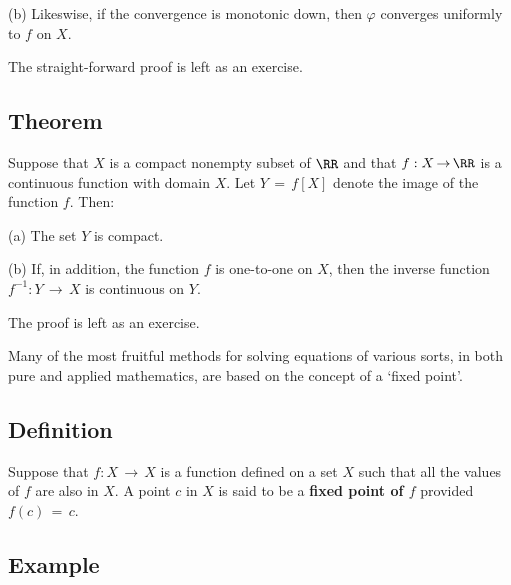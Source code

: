 \V

        (b) Likeswise, if the convergence is monotonic down, then ${\varphi}$ converges uniformly to $f$ on $X$.

\V

        The straight-forward proof is left as an exercise.

\V
\V


             \subsection{\small{\bf Theorem}}
            \label{ThmF35.30}

\V

        Suppose that $X$ is a compact nonempty subset of ${\RR}$ and that $f:X \,{\rightarrow}\, {\RR}$ is a continuous function with domain $X$.
    Let $Y \,=\, f[X]$ denote the image of the function $f$. Then:

\V

        (a) The set $Y$ is compact.

\V

        (b) If, in addition, the function $f$ is one-to-one on $X$, then the inverse function $f^{-1}:Y \,{\rightarrow}\, X$ is continuous on $Y$.

\V

        The proof is left as an exercise.

\V
\V

        Many of the most fruitful methods for solving equations of various sorts, in both pure and applied mathematics, are based on the concept of a `fixed point'.

\V

             \subsection{\small{\bf Definition}}
            \label{DefF35.40}

\V

        Suppose that $f:X \,{\rightarrow}\, X$ is a function defined on a set $X$ such that all the values of $f$ are also in $X$.
    A point $c$ in $X$ is said to be a {\bf fixed point of $f$} provided $f(c) \,=\, c$.

\V

             \subsection{\small{\bf Example}}
            \label{ExampF35.50}

